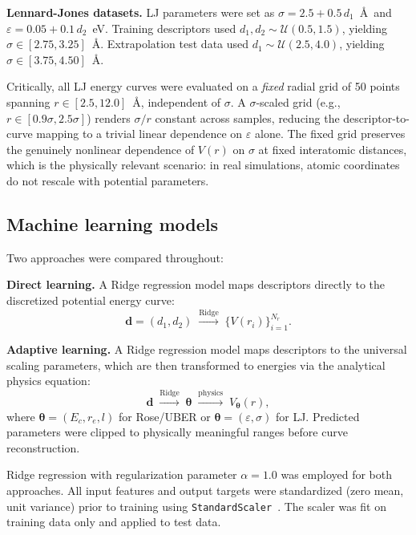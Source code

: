 \documentclass[aps,prb,twocolumn,superscriptaddress,longbibliography,floatfix]{revtex4-2}
\begin{document}
\textbf{Lennard-Jones datasets.} LJ parameters were set as $\sigma = 2.5 + 0.5\, d_1$~\AA\ and $\varepsilon = 0.05 + 0.1\, d_2$~eV. Training descriptors used $d_1, d_2 \sim \mathcal{U}(0.5, 1.5)$, yielding $\sigma \in [2.75, 3.25]$~\AA. Extrapolation test data used $d_1 \sim \mathcal{U}(2.5, 4.0)$, yielding $\sigma \in [3.75, 4.50]$~\AA.

Critically, all LJ energy curves were evaluated on a \emph{fixed} radial grid of 50 points spanning $r \in [2.5, 12.0]$~\AA, independent of $\sigma$. A $\sigma$-scaled grid (e.g., $r \in [0.9\sigma, 2.5\sigma]$) renders $\sigma/r$ constant across samples, reducing the descriptor-to-curve mapping to a trivial linear dependence on $\varepsilon$ alone. The fixed grid preserves the genuinely nonlinear dependence of $V(r)$ on $\sigma$ at fixed interatomic distances, which is the physically relevant scenario: in real simulations, atomic coordinates do not rescale with potential parameters.

\subsection{Machine learning models}
\label{sec:ml_models}

Two approaches were compared throughout:

\textbf{Direct learning.} A Ridge regression model maps descriptors directly to the discretized potential energy curve:
\begin{equation}
  \mathbf{d} = (d_1, d_2) \;\xrightarrow{\text{Ridge}}\; \{V(r_i)\}_{i=1}^{N_r}.
  \label{eq:direct}
\end{equation}

\textbf{Adaptive learning.} A Ridge regression model maps descriptors to the universal scaling parameters, which are then transformed to energies via the analytical physics equation:
\begin{equation}
  \mathbf{d} \;\xrightarrow{\text{Ridge}}\; \boldsymbol{\theta} \;\xrightarrow{\text{physics}}\; V_{\boldsymbol{\theta}}(r),
  \label{eq:adaptive}
\end{equation}
where $\boldsymbol{\theta} = (E_c, r_e, l)$ for Rose/UBER or $\boldsymbol{\theta} = (\varepsilon, \sigma)$ for LJ. Predicted parameters were clipped to physically meaningful ranges before curve reconstruction.

Ridge regression with regularization parameter $\alpha = 1.0$ was employed for both approaches. All input features and output targets were standardized (zero mean, unit variance) prior to training using \texttt{StandardScaler}~\cite{Pedregosa2011}. The scaler was fit on training data only and applied to test data.
\end{document}
